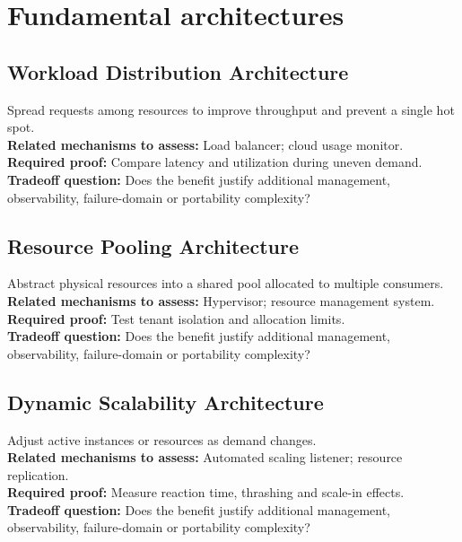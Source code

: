 \documentclass[10pt,letterpaper]{article}
\begin{document}
\section{Fundamental architectures}
\subsection{Workload Distribution Architecture}
Spread requests among resources to improve throughput and prevent a single hot spot.\\[3pt]
\textbf{Related mechanisms to assess:} Load balancer; cloud usage monitor.\\[3pt]
\textbf{Required proof:} Compare latency and utilization during uneven demand.\\[3pt]
\textbf{Tradeoff question:} Does the benefit justify additional management, observability, failure-domain or portability complexity?\\[3pt]
\subsection{Resource Pooling Architecture}
Abstract physical resources into a shared pool allocated to multiple consumers.\\[3pt]
\textbf{Related mechanisms to assess:} Hypervisor; resource management system.\\[3pt]
\textbf{Required proof:} Test tenant isolation and allocation limits.\\[3pt]
\textbf{Tradeoff question:} Does the benefit justify additional management, observability, failure-domain or portability complexity?\\[3pt]
\subsection{Dynamic Scalability Architecture}
Adjust active instances or resources as demand changes.\\[3pt]
\textbf{Related mechanisms to assess:} Automated scaling listener; resource replication.\\[3pt]
\textbf{Required proof:} Measure reaction time, thrashing and scale-in effects.\\[3pt]
\textbf{Tradeoff question:} Does the benefit justify additional management, observability, failure-domain or portability complexity?\\[3pt]
\end{document}
